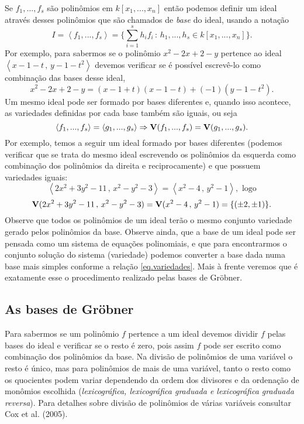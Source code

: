 Se $f_1,...,f_s$ são polinômios em $k[x_1,...,x_n]$ então podemos definir um ideal através desses polinômios que são chamados de {\it base} do ideal, usando a notação
\begin{equation*}
I=\left\langle f_1,...,f_s \right\rangle = \{\sum_{i=1}^s h_if_i\,:\,h_1,...,h_s \in k[x_1,...,x_n]\}.
\end{equation*}
Por exemplo, para sabermos se o polinômio $x^2-2x+2-y$ pertence ao ideal $\left\langle x-1-t\,,\,y-1-t^2 \right\rangle$ devemos verificar se é possível escrevê-lo como combinação das bases desse ideal, 
\begin{equation*}
x^2-2x+2-y=(x-1+t)(x-1-t)+(-1)(y-1-t^2).
\end{equation*}
Um mesmo ideal pode ser formado por bases diferentes e, quando isso acontece, as variedades definidas por cada base também são iguais, ou seja
\begin{equation*}
\left\langle f_1,...,f_s \right\rangle = \left\langle g_1,...,g_s \right\rangle \Rightarrow {\bf V}(f_1,...,f_s)={\bf V}(g_1,...,g_s).
\end{equation*}
Por exemplo, temos a seguir um ideal formado por bases diferentes (podemos verificar que se trata do mesmo ideal escrevendo os polinômios da esquerda como combinação dos polinômios da direita e reciprocamente) e que possuem variedades iguais:
\begin{equation*}
\left\langle 2x^2+3y^2-11\,,\,x^2-y^2-3 \right\rangle = \left\langle x^2-4\,,\,y^2-1 \right\rangle,\,\, \text{logo}
\end{equation*}
\begin{equation}\label{eq.variedades}
{\bf V}(2x^2+3y^2-11\,,\,x^2-y^2-3)={\bf V}(x^2-4\,,\,y^2-1)=\{(\pm2,\pm1)\}.
\end{equation}
Observe que todos os polinômios de um ideal terão o mesmo conjunto variedade gerado pelos polinômios da base. Observe ainda, que a base de um ideal pode ser pensada como um sistema de equações polinomiais, e que para encontrarmos o conjunto solução do sistema (variedade) podemos converter a base dada numa base mais simples conforme a relação \ref{eq.variedades}. Mais à frente veremos que é exatamente esse o procedimento realizado pelas bases de Gr\"obner.

\subsection{As bases de Gr\"obner}

Para sabermos se um polinômio $f$ pertence a um ideal devemos dividir $f$ pelas bases do ideal e verificar se o resto é zero, pois assim $f$ pode ser escrito como combinação dos polinômios da base. Na divisão de polinômios de uma variável o resto é único, mas para polinômios de mais de uma variável, tanto o resto como os quocientes podem variar dependendo da ordem dos divisores e da ordenação de monômios escolhida ({\it lexicográfica, lexicográfica graduada e lexicográfica graduada reversa}). Para detalhes sobre divisão de polinômios de várias variáveis consultar Cox et al. (2005). 

